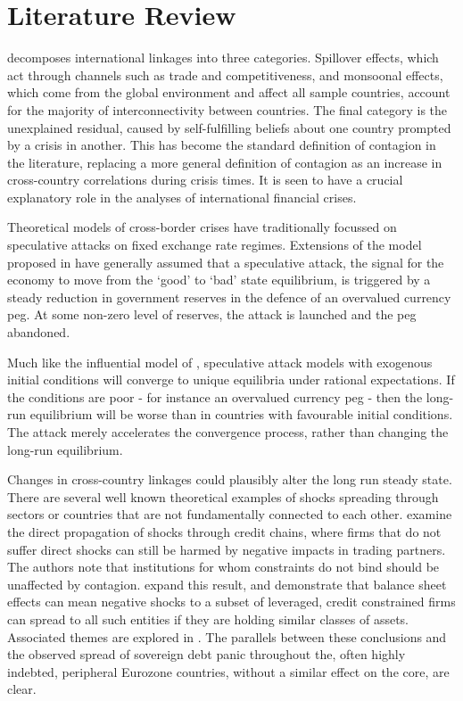 \documentclass[../base.tex]{subfiles}
\begin{document}
\section{Literature Review}
\label{lit}

\cite{masson1998contagion} decomposes international linkages into three categories. Spillover effects, which act through channels such as trade and competitiveness, and monsoonal effects, which come from the global environment and affect all sample countries, account for the majority of interconnectivity between countries. The final category is the unexplained residual, caused by self-fulfilling beliefs about one country prompted by a crisis in another. This has become the standard definition of contagion in the literature, replacing a more general definition of contagion as an increase in cross-country correlations during crisis times. It is seen to have a crucial explanatory role in the analyses of international financial crises. 

Theoretical models of cross-border crises have traditionally focussed on speculative attacks on fixed exchange rate regimes. Extensions of the model proposed in \cite{krugman1979model} have generally assumed that a speculative attack, the signal for the economy to move from the `good' to `bad' state equilibrium, is triggered by a steady reduction in government reserves in the defence of an overvalued currency peg. At some non-zero level of reserves, the attack is launched and the peg abandoned.

Much like the influential model of \cite{barro1983rules}, speculative attack models with exogenous initial conditions will converge to unique equilibria under rational expectations. If the conditions are poor - for instance an overvalued currency peg - then the long-run equilibrium will be worse than in countries with favourable initial conditions. The attack merely accelerates the convergence process, rather than changing the long-run equilibrium.

Changes in cross-country linkages could plausibly alter the long run steady state. There are several well known theoretical examples of shocks spreading through sectors or countries that are not fundamentally connected to each other. \cite{kiyotaki1997credit} examine the direct propagation of shocks through credit chains, where firms that do not suffer direct shocks can still be harmed by negative impacts in trading partners. The authors note that institutions for whom constraints do not bind should be unaffected by contagion. \cite{kiyotaki2002balance} expand this result, and demonstrate that balance sheet effects can mean negative shocks to a subset of leveraged, credit constrained firms can spread to all such entities if they are holding similar classes of assets. Associated themes are explored in \cite{rochet1996interbank}. The parallels between these conclusions and the observed spread of sovereign debt panic throughout the, often highly indebted, peripheral Eurozone countries, without a similar effect on the core, are clear.
\end{document}

